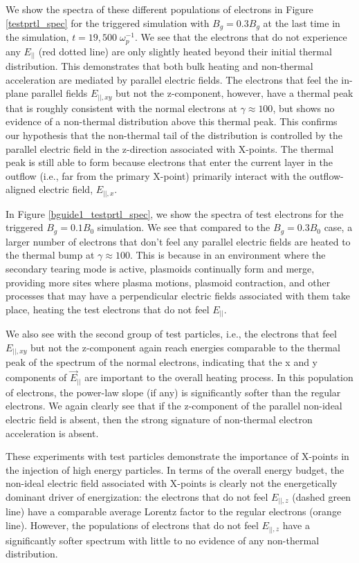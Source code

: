 We show the spectra of these different populations of electrons in Figure \ref{testprtl_spec} for the triggered simulation with $B_{g}=0.3B_{g}$ at the last time in the simulation, $t=19,500 \; \omega_{p}^{-1}$.
We see that the electrons that do not experience any $E_{||}$ (red dotted line) are only slightly heated beyond their initial thermal distribution.  This demonstrates that both bulk heating and non-thermal acceleration are mediated by parallel electric fields.  The electrons that feel the in-plane parallel fields $E_{||,xy}$ but not the z-component, however, have a thermal peak that is roughly consistent with the normal electrons at $\gamma \approx 100$, but shows no evidence of a non-thermal distribution above this thermal peak.  This confirms our hypothesis that the non-thermal tail of the distribution is controlled by the parallel electric field in the z-direction associated with X-points.  The thermal peak is still able to form because electrons that enter the current layer in the outflow (i.e., far from the primary X-point) primarily interact with the outflow-aligned electric field, $E_{||,x}$.

In Figure \ref{bguide1_testprtl_spec}, we show the spectra of test electrons for the triggered $B_{g} = 0.1 B_{0}$ simulation.  We see that compared to the $B_{g}=0.3B_{0}$ case, a larger number of electrons that don't feel any parallel electric fields are heated to the thermal bump at $\gamma \approx 100$.  This is because in an environment where the secondary tearing mode is active, plasmoids continually form and merge, providing more sites where plasma motions, plasmoid contraction, and other processes that may have a perpendicular electric fields associated with them take place, heating the test electrons that do not feel $E_{||}$.  

We also see with the second group of test particles, i.e., the electrons that feel $E_{||,xy}$ but not the z-component again reach energies comparable to the thermal peak of the spectrum of the normal electrons, indicating that the x and y components of $\vec{E}_{||}$ are important to the overall heating process.  In this population of electrons, the power-law slope (if any) is significantly softer than the regular electrons.  We again clearly see that if the z-component of the parallel non-ideal electric field is absent, then the strong signature of non-thermal electron acceleration is absent.

These experiments with test particles demonstrate the importance of X-points in the injection of high energy particles.  In terms of the overall energy budget, the non-ideal electric field associated with X-points is clearly not the energetically dominant driver of energization: the electrons that do not feel $E_{||,z}$ (dashed green line) have a comparable average Lorentz factor to the regular electrons (orange line).  However, the populations of electrons that do not feel $E_{||,z}$ have a significantly softer spectrum with little to no evidence of any non-thermal distribution.
	
